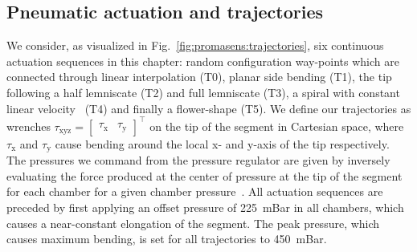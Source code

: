 \subsection{Pneumatic actuation and trajectories}
We consider, as visualized in Fig.~\ref{fig:promasens:trajectories}, six continuous actuation sequences in this chapter: random configuration way-points which are connected through linear interpolation (T0), planar side bending (T1), the tip following a half lemniscate (T2) and full lemniscate (T3), a spiral with constant linear velocity~\citep{carrasco2018constant} (T4) and finally a flower-shape (T5).
We define our trajectories as wrenches  $\tau_\mathrm{xyz} = \begin{bmatrix} \tau_\mathrm{x} & \tau_\mathrm{y} \end{bmatrix}^\top$ on the tip of the segment in Cartesian space, where $\tau_\mathrm{x}$ and $\tau_\mathrm{y}$ cause bending around the local x- and y-axis  of the tip respectively. %
The pressures we command from the pressure regulator are given by inversely evaluating the force produced at the center of pressure at the tip of the segment for each chamber for a given chamber pressure~\citep{della2019dynamic}.
All actuation sequences are preceded by first applying an offset pressure of \SI{225}{mBar} in all chambers, which causes a near-constant elongation of the segment. The peak pressure, which causes maximum bending, is set for all trajectories to \SI{450}{mBar}.


